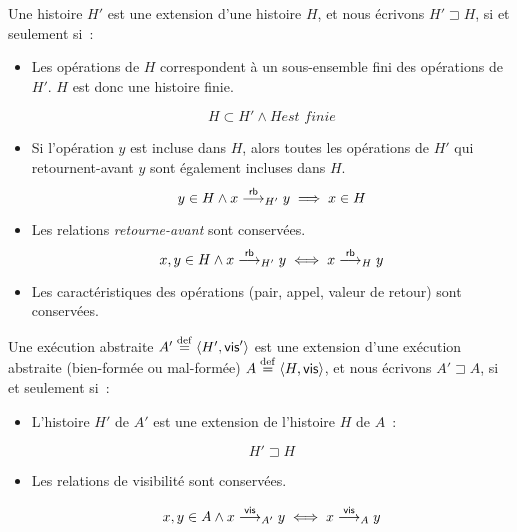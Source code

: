 \begin{definition}\label{def:hist-ext}
Une histoire $H'$ est une extension d'une histoire $H$, et nous écrivons $H' \sqsupset H$, si et seulement si~:
\begin{itemize}
  \item Les opérations de $H$ correspondent à un sous-ensemble fini des opérations de $H'$. $H$ est donc une histoire finie.

  \begin{equation*}
    H \subset H' \land H \textit{est finie}
  \end{equation*}

  \item Si l'opération $y$ est incluse dans $H$, alors toutes les opérations de $H'$ qui retournent-avant $y$ sont également incluses dans $H$.
  \begin{equation*}
    y \in H \land x \rb_{H'} y \implies x \in H
  \end{equation*}
  
  \item Les relations \emph{retourne-avant} sont conservées.
  \begin{equation*}
    x, y \in H \land x \rb_{H'} y \iff x \rb_{H} y
  \end{equation*}
  
  \item Les caractéristiques des opérations (pair, appel, valeur de retour) sont conservées.
\end{itemize}
\end{definition}


\begin{definition}\label{def:wf-abstract-exec-prefix}
Une exécution abstraite $A' \defeq \tuple*{H',\trm{vis}'}$ est une extension d'une exécution abstraite (bien-formée ou mal-formée) $A \defeq \tuple*{H,\trm{vis}}$, et nous écrivons $A' \sqsupset A$, si et seulement si~:
\begin{itemize}
  \item L'histoire $H'$ de $A'$ est une extension de l'histoire $H$ de $A$~:

  \begin{equation*}
    H' \sqsupset H
  \end{equation*}

  \item Les relations de visibilité sont conservées.

  \begin{equation*}
    x, y \in A \land x \vis_{A'} y \iff x \vis_{A} y
  \end{equation*}
\end{itemize}
\end{definition}


